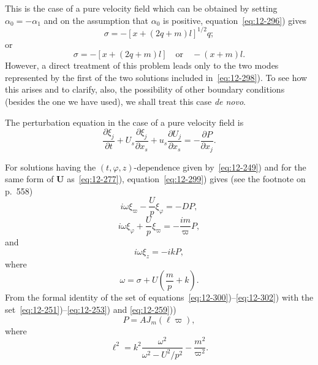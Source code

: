 This is the case of a pure velocity field which can be obtained by setting $\alpha_0 = -\alpha_1$ and on the assumption that $\alpha_0$ is positive, equation~\eqref{eq:12-296}) gives
\begin{equation}
\label{eq:12-297}
\sigma = -[x+(2q+m)l]^{1/2}q;
\end{equation}
or
\begin{equation}
\label{eq:12-298}
\sigma = -[x+(2q+m)l] \quad \text{or} \quad -(x+m)l.
\end{equation}
However, a direct treatment of this problem leads only to the two modes represented by the first of the two solutions included in~\eqref{eq:12-298}). To see how this arises and to clarify, also, the possibility of other boundary conditions (besides the one we have used), we shall treat this case \emph{de novo}.

The perturbation equation in the case of a pure velocity field is
\begin{equation}
\label{eq:12-299}
\frac{\partial\xi_j}{\partial t} + U_s\frac{\partial\xi_j}{\partial x_s} + u_s\frac{\partial U_j}{\partial x_s} = -\frac{\partial P}{\partial x_j}.
\end{equation}

For solutions having the $(t,\varphi,z)$-dependence given by~\eqref{eq:12-249}) and for the same form of $\mathbf{U}$ as~\eqref{eq:12-277}), equation~\eqref{eq:12-299}) gives (see the footnote on p.~558)
\begin{equation}
\label{eq:12-300}
i\omega\xi_\varpi - \frac{U}{p}\xi_\varphi = -DP,
\end{equation}
\begin{equation}
\label{eq:12-301}
i\omega\xi_\varphi + \frac{U}{p}\xi_\varpi = -\frac{im}{\varpi}P,
\end{equation}
and
\begin{equation}
\label{eq:12-302}
i\omega\xi_z = -ikP,
\end{equation}
where
\begin{equation}
\label{eq:12-303}
\omega = \sigma + U\left(\frac{m}{p}+k\right).
\end{equation}
From the formal identity of the set of equations~\eqref{eq:12-300})--\eqref{eq:12-302}) with the set~\eqref{eq:12-251})--\eqref{eq:12-253}) and \eqref{eq:12-259}))
\begin{equation}
\label{eq:12-304}
P = AJ_m(\ell\varpi),
\end{equation}
where
\begin{equation}
\label{eq:12-305}
\ell^2 = k^2\frac{\omega^2}{\omega^2-U^2/p^2} - \frac{m^2}{\varpi^2}.
\end{equation}

